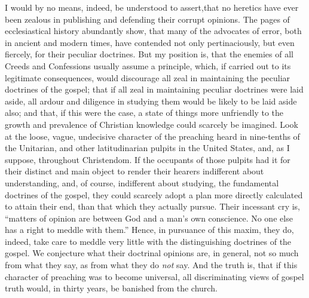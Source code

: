 \documentclass[
]{book}
\begin{document}
I would by no means, indeed, be understood to assert,that no heretics have ever been zealous in publishing and defending their corrupt opinions. The pages of ecclesiastical history abundantly show, that many of the advocates of error, both in ancient and modern times, have contended not only pertinaciously, but even fiercely, for their peculiar doctrines. But my position is, that the enemies of all Creeds and Confessions usually assume a principle, which, if carried out to its legitimate consequences, would discourage all zeal in maintaining the peculiar doctrines of the gospel; that if all zeal in maintaining peculiar doctrines were laid aside, all ardour and diligence in studying them would be likely to be laid aside also; and that, if this were the case, a state of things more unfriendly to the growth and prevalence of Christian knowledge could scarcely be imagined. Look at the loose, vague, undecisive character of the preaching heard in nine-tenths of the Unitarian, and other latitudinarian pulpits in the United States, and, as I suppose, throughout Christendom. If the occupants of those pulpits had it for their distinct and main object to render their hearers indifferent about understanding, and, of course, indifferent about studying, the fundamental doctrines of the gospel, they could scarcely adopt a plan more directly calculated to attain their end, than that which they actually pursue. Their incessant cry is, ``matters of opinion are between God and a man's own conscience. No one else has a right to meddle with them.'' Hence, in pursuance of this maxim, they do, indeed, take care to meddle very little with the distinguishing doctrines of the gospel. We conjecture what their doctrinal opinions are, in general, not so much from what they say, as from what they do \emph{not} say. And the truth is, that if this character of preaching was to become universal, all discriminating views of gospel truth would, in thirty years, be banished from the church.
\end{document}
